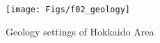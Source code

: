 \begin{figure} [ht!]
    \texttt{[image: Figs/f02\_geology]}
  \caption{Geology settings of Hokkaido Area}
  \label{fig:geology}
\end{figure}


%

